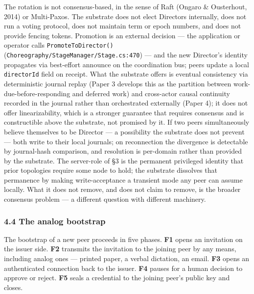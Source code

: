\documentclass[
]{article}
\begin{document}
The rotation is not consensus-based, in the sense of Raft (Ongaro \&
Ousterhout, 2014) or Multi-Paxos. The substrate does not elect Directors
internally, does not run a voting protocol, does not maintain term or
epoch numbers, and does not provide fencing tokens. Promotion is an
external decision --- the application or operator calls
\texttt{PromoteToDirector()}
(\texttt{Choreography/StageManager/Stage.cs:470}) --- and the new
Director's identity propagates via best-effort announce on the
coordination bus; peers update a local \texttt{directorId} field on
receipt. What the substrate offers is eventual consistency via
deterministic journal replay (Paper 3 develops this as the partition
between work-due-before-responding and deferred work) and cross-actor
causal continuity recorded in the journal rather than orchestrated
externally (Paper 4); it does not offer linearizability, which is a
stronger guarantee that requires consensus and is constructible above
the substrate, not promised by it. If two peers simultaneously believe
themselves to be Director --- a possibility the substrate does not
prevent --- both write to their local journals; on reconnection the
divergence is detectable by journal-hash comparison, and resolution is
per-domain rather than provided by the substrate. The server-role of §3
is the permanent privileged identity that prior topologies require some
node to hold; the substrate dissolves that permanence by making
write-acceptance a transient mode any peer can assume locally. What it
does not remove, and does not claim to remove, is the broader consensus
problem --- a different question with different machinery.

\subsubsection{4.4 The analog bootstrap}\label{the-analog-bootstrap}

The bootstrap of a new peer proceeds in five phases. \textbf{F1} opens
an invitation on the issuer side. \textbf{F2} transmits the invitation
to the joining peer by any means, including analog ones --- printed
paper, a verbal dictation, an email. \textbf{F3} opens an authenticated
connection back to the issuer. \textbf{F4} pauses for a human decision
to approve or reject. \textbf{F5} seals a credential to the joining
peer's public key and closes.
\end{document}
